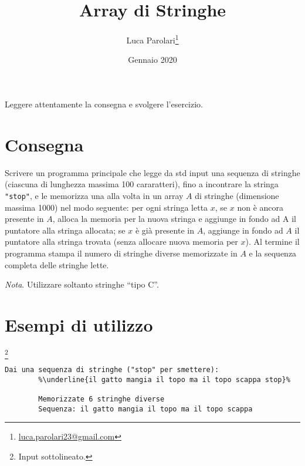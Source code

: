 \documentclass[addpoints,12pt,answers]{exam}
\author{Luca Parolari\footnote{\href{mailto:luca.parolari23@gmail.com}{luca.parolari23@gmail.com}}}
\begin{document}
    
    \title{Array di Stringhe}
    \date{Gennaio 2020}
    
    \maketitle
    
    Leggere attentamente la consegna e svolgere l'esercizio.
    
    \section{Consegna}
    
    Scrivere un programma principale che legge da std input una sequenza di stringhe (ciascuna di lunghezza massima 100 cararatteri), fino a incontrare la stringa \texttt{"stop"}, e le memorizza una alla volta in un array $A$ di stringhe (dimensione massima 1000) nel modo seguente: per ogni stringa letta $x$, se $x$ non è ancora presente in $A$, alloca la memoria per la nuova stringa e aggiunge in fondo ad A il puntatore alla stringa allocata; se $x$ è già presente in $A$, aggiunge in fondo ad $A$ il puntatore alla stringa trovata (senza allocare nuova memoria per $x$).
    Al termine il programma stampa il numero di stringhe diverse memorizzate in $A$ e la sequenza completa delle stringhe lette.
    
    \textit{Nota}. Utilizzare soltanto stringhe ``tipo C''.
    
    \section{Esempi di utilizzo}
    \footnote{Input sottolineato.}
    
	\begin{lstlisting}[style=verbatim]
		Dai una sequenza di stringhe ("stop" per smettere):
		%\underline{il gatto mangia il topo ma il topo scappa stop}%
		
		Memorizzate 6 stringhe diverse
		Sequenza: il gatto mangia il topo ma il topo scappa
	\end{lstlisting}
    
\end{document}
